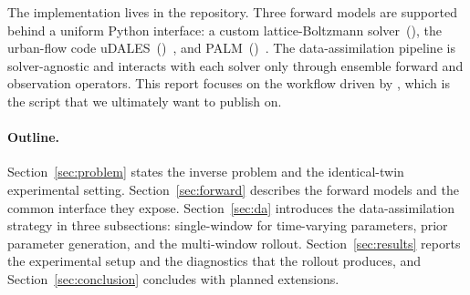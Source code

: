 The implementation lives in the \pyurbanair{} repository.  Three
forward models are supported behind a uniform Python interface: a
custom lattice-Boltzmann solver~(\pylbm{}), the urban-flow \LES{}
code uDALES~(\pyudales{})~\cite{suter2018udales}, and
PALM~(\pypalm{})~\cite{maronga2020palm}.  The data-assimilation
pipeline is solver-agnostic and interacts with each solver only
through ensemble forward and observation operators.  This report
focuses on the workflow driven by
\rolloutscript{}, which is
the script that we ultimately want to publish on.

\paragraph{Outline.}
Section~\ref{sec:problem} states the inverse problem and the
identical-twin experimental setting.  Section~\ref{sec:forward}
describes the forward models and the common interface they expose.
Section~\ref{sec:da} introduces the data-assimilation strategy in
three subsections: single-window \ESMDA{} for time-varying
parameters, prior parameter generation, and the multi-window
rollout.  Section~\ref{sec:results} reports the experimental setup
and the diagnostics that the rollout produces, and
Section~\ref{sec:conclusion} concludes with planned extensions.
